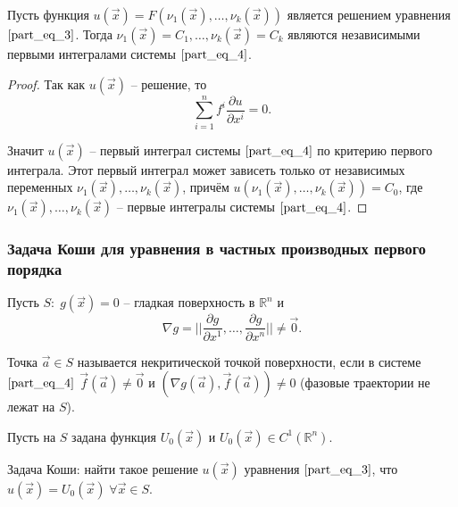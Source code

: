 \begin{theorem}
	Пусть функция $u \left( \vec{x} \right) = F \left( \nu_1 \left( \vec{x} \right), \dots, \nu_k \left( \vec{x} \right) \right)$ является решением уравнения $\eqref{part_eq_3}$. Тогда $\nu_1 \left( \vec{x} \right) = C_1, \dots, \nu_k \left( \vec{x} \right) = C_k$ являются независимыми первыми интегралами системы $\eqref{part_eq_4}$. 
\end{theorem}
\begin{proof}
	Так как $u \left( \vec{x} \right)$ -- решение, то 
	\begin{equation*}
		\sum \limits_{i = 1}^{n} f^i \frac{\partial u}{\partial x^i} = 0.
	\end{equation*}
	
	Значит $u \left( \vec{x} \right)$ -- первый интеграл системы $\eqref{part_eq_4}$ по критерию первого интеграла. Этот первый интеграл может зависеть только от независимых переменных $\nu_1 \left( \vec{x} \right), \dots, \nu_k \left( \vec{x} \right)$, причём $u \left( \nu_1 \left( \vec{x} \right), \dots, \nu_k \left( \vec{x} \right) \right) = C_0$, где $\nu_1 \left( \vec{x} \right), \dots, \nu_k \left( \vec{x} \right)$ -- первые интегралы системы $\eqref{part_eq_4}$.
\end{proof}

\subsubsection{Задача Коши для уравнения в частных производных первого порядка}

Пусть $S: \; g \left( \vec{x} \right) = 0$ -- гладкая поверхность в $\mathbb{R}^n$ и 
\begin{equation*}
	\nabla g = \bigg| \bigg| \frac{\partial g}{\partial x^{1}}, \dots, \frac{\partial g}{\partial x^{n}} \bigg| \bigg| \neq \vec{0}.
\end{equation*}

\begin{definition}
	Точка $\vec{a} \in S$ называется некритической точкой поверхности, если в системе $\eqref{part_eq_4}$ $\vec{f} \left( \vec{a} \right) \neq \vec{0}$ и $ \left( \nabla g \left( \vec{a} \right), \vec{f} \left( \vec{a} \right) \right) \neq 0$  (фазовые траектории не лежат на $S$).
\end{definition}

Пусть на $S$ задана функция $U_0 \left( \vec{x} \right)$ и $U_0 \left( \vec{x} \right) \in C^1 \left( \mathbb{R}^n \right)$.

Задача Коши: найти такое решение $u \left( \vec{x} \right)$ уравнения $\eqref{part_eq_3}$, что $u \left( \vec{x} \right) = U_0 \left( \vec{x} \right) \; \forall \vec{x} \in S$.

